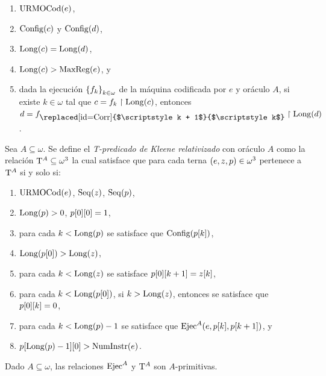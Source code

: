 \begin{agregado}
\begin{definition}
	\begin{enumerate}
		\item $\URMOCODIGO\pa*{e}$,
		\item $\CONFIGURACIONES\pa*{c}$ y $\CONFIGURACIONES\pa*{d}$,
		\item $\LONGITUD\pa*{c} =\LONGITUD\pa*{d}$,
		\item $\LONGITUD\pa*{c} >\MAXREGISTRO\pa*{e}$, y
		\item dada la ejecución $\set*{f_{k}}_{k\in\omega}$ de la máquina codificada por $e$ y oráculo $A$, si existe $k\in\omega$ tal que $c = f_{k}\upharpoonright\LONGITUD\pa*{c}$, entonces $d = f_{\mbox{\replaced[id=Corr]{$\scriptstyle k + 1$}{$\scriptstyle k$}}}\upharpoonright\LONGITUD\pa*{d}$.
	\end{enumerate}
\end{definition}

\begin{definition}
	\label{def: t_predicado_relativizado}
	Sea $A\subseteq\omega$. Se define el \emph{T-predicado de Kleene relativizado} con oráculo $A$ como la relación $\KLEENE[A]\subseteq\omega^{3}$ la cual satisface que para cada terna $\pa*{e, z, p}\in\omega^{3}$ pertenece a $\KLEENE[A]$ si y solo si:

	\begin{enumerate}
		\item $\URMOCODIGO\pa*{e}$, $\SECUENCIAS\pa*{z}$, $\SECUENCIAS\pa*{p}$,
		\item $\LONGITUD\pa*{p} > 0$, $p\bra*{0}\bra*{0} = 1$,
		\item para cada $k <\LONGITUD\pa*{p}$ se satisface que $\CONFIGURACIONES\pa*{p\bra*{k}}$,
		\item $\LONGITUD\pa*{p\bra*{0}} >\LONGITUD\pa*{z}$,
		\item para cada $k <\LONGITUD\pa*{z}$ se satisface $p\bra*{0}\bra*{k + 1} = z\bra*{k}$,
		\item para cada $k <\LONGITUD\pa*{p\bra*{0}}$, si $k >\LONGITUD\pa*{z}$, entonces se satisface que $p\bra*{0}\bra*{k} = 0$,
		\item para cada $k <\LONGITUD\pa*{p} - 1$ se satisface que $\EJECUCION^{A}\pa*{e, p\bra*{k}, p\bra*{k + 1}}$, y
		\item $p\bra*{\LONGITUD\pa*{p} - 1}\bra*{0} >\NUMINSTRUCCIONES\pa*{e}$.
	\end{enumerate}
\end{definition}

\begin{theorem}
	\label{theo: ejec_t_relativizados_primitivos}
	Dado $A\subseteq\omega$, las relaciones $\EJECUCION^{A}$ y $\KLEENE[A]$ son $A$-primitivas.
\end{theorem}


\end{agregado}

